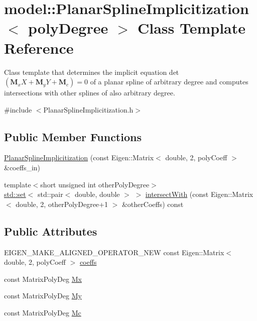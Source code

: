 \hypertarget{classmodel_1_1_planar_spline_implicitization}{}\section{model\+:\+:Planar\+Spline\+Implicitization$<$ poly\+Degree $>$ Class Template Reference}
\label{classmodel_1_1_planar_spline_implicitization}


Class template that determines the implicit equation det $\left(\mathbf{M}_xX+\mathbf{M}_yY+\mathbf{M}_c\right)=0$ of a planar spline of arbitrary degree and computes intersections with other splines of also arbitrary degree.  




{\ttfamily \#include $<$Planar\+Spline\+Implicitization.\+h$>$}

\subsection*{Public Member Functions}
\begin{DoxyCompactItemize}
\item 
\hyperlink{classmodel_1_1_planar_spline_implicitization_acf18a04263296e4de97047ffa0f7ada3}{Planar\+Spline\+Implicitization} (const Eigen\+::\+Matrix$<$ double, 2, poly\+Coeff $>$ \&coeffs\+\_\+in)
\item 
{\footnotesize template$<$short unsigned int other\+Poly\+Degree$>$ }\\\hyperlink{plot_cells_8m_a03623d69001c34fc77654be29bdc3d8a}{std\+::set}$<$ std\+::pair$<$ double, double $>$ $>$ \hyperlink{classmodel_1_1_planar_spline_implicitization_ad23cca21c98b598dc94bae17262c7908}{intersect\+With} (const Eigen\+::\+Matrix$<$ double, 2, other\+Poly\+Degree+1 $>$ \&other\+Coeffs) const 
\end{DoxyCompactItemize}
\subsection*{Public Attributes}
\begin{DoxyCompactItemize}
\item 
E\+I\+G\+E\+N\+\_\+\+M\+A\+K\+E\+\_\+\+A\+L\+I\+G\+N\+E\+D\+\_\+\+O\+P\+E\+R\+A\+T\+O\+R\+\_\+\+N\+E\+W const Eigen\+::\+Matrix$<$ double, 2, poly\+Coeff $>$ \hyperlink{classmodel_1_1_planar_spline_implicitization_a9ad146f6d10f2cfe59742c5e1b93f963}{coeffs}
\item 
const Matrix\+Poly\+Deg \hyperlink{classmodel_1_1_planar_spline_implicitization_aca2c04c2803bbe1ba25449106f66c04b}{Mx}
\item 
const Matrix\+Poly\+Deg \hyperlink{classmodel_1_1_planar_spline_implicitization_a1fb0a787fa04ff39dadaf2121ee908d5}{My}
\item 
const Matrix\+Poly\+Deg \hyperlink{classmodel_1_1_planar_spline_implicitization_a06a484823965930f62c9b30ce44555f0}{Mc}
\end{DoxyCompactItemize}
